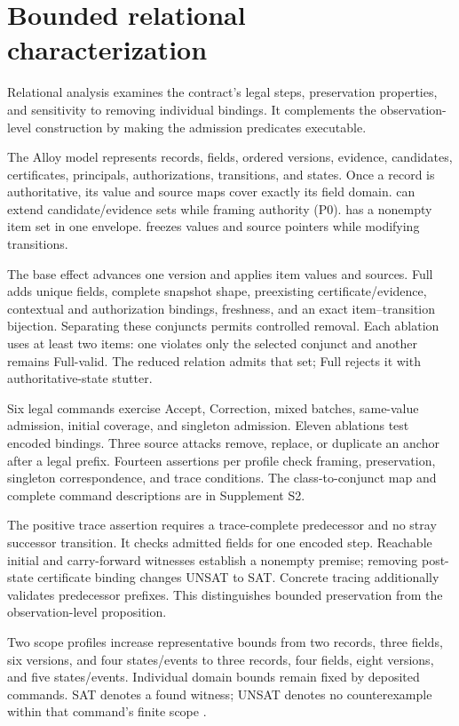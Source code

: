 \section{Bounded relational characterization}
\label{sec:alloy}

Relational analysis examines the contract's legal steps, preservation properties, and sensitivity to removing individual bindings. It complements the observation-level construction by making the admission predicates executable.

The Alloy model represents records, fields, ordered versions, evidence, candidates, certificates, principals, authorizations, transitions, and states. Once a record is authoritative, its value and source maps cover exactly its field domain.  can extend candidate/evidence sets while framing authority (P0).  has a nonempty item set in one envelope.  freezes values and source pointers while modifying transitions.

The base effect advances one version and applies item values and sources. Full adds unique fields, complete snapshot shape, preexisting certificate/evidence, contextual and authorization bindings, freshness, and an exact item--transition bijection. Separating these conjuncts permits controlled removal. Each ablation uses at least two items: one violates only the selected conjunct and another remains Full-valid. The reduced relation admits that set; Full rejects it with authoritative-state stutter.

Six legal commands exercise Accept, Correction, mixed batches, same-value admission, initial coverage, and singleton admission. Eleven ablations test encoded bindings. Three source attacks remove, replace, or duplicate an anchor after a legal prefix. Fourteen assertions per profile check framing, preservation, singleton correspondence, and trace conditions. The class-to-conjunct map and complete command descriptions are in Supplement S2.

The positive trace assertion requires a trace-complete predecessor and no stray successor transition. It checks admitted fields for one encoded step. Reachable initial and carry-forward witnesses establish a nonempty premise; removing post-state certificate binding changes UNSAT to SAT. Concrete tracing additionally validates predecessor prefixes. This distinguishes bounded preservation from the observation-level proposition.

Two scope profiles increase representative bounds from two records, three fields, six versions, and four states/events to three records, four fields, eight versions, and five states/events. Individual domain bounds remain fixed by deposited commands. SAT denotes a found witness; UNSAT denotes no counterexample within that command's finite scope \citep{jackson2002alloy,torlak2007kodkod}.


